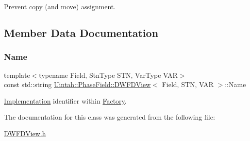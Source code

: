 Prevent copy (and move) assignment. 



\subsection{Member Data Documentation}
\mbox{\label{classUintah_1_1PhaseField_1_1DWFDView_a05d3a36d8ec564ad44ce85c2880abe1a}} 
\subsubsection{\texorpdfstring{Name}{Name}}
{\footnotesize\ttfamily template$<$typename Field, Stn\+Type S\+TN, Var\+Type V\+AR$>$ \\
const std\+::string \hyperlink{classUintah_1_1PhaseField_1_1DWFDView}{Uintah\+::\+Phase\+Field\+::\+D\+W\+F\+D\+View}$<$ Field, S\+TN, V\+AR $>$\+::Name\hspace{0.3cm}{\ttfamily [static]}}



\hyperlink{classUintah_1_1PhaseField_1_1Implementation}{Implementation} identifier within \hyperlink{classUintah_1_1PhaseField_1_1Factory}{Factory}. 



The documentation for this class was generated from the following file\+:\begin{DoxyCompactItemize}
\item 
\hyperlink{DWFDView_8h}{D\+W\+F\+D\+View.\+h}\end{DoxyCompactItemize}
